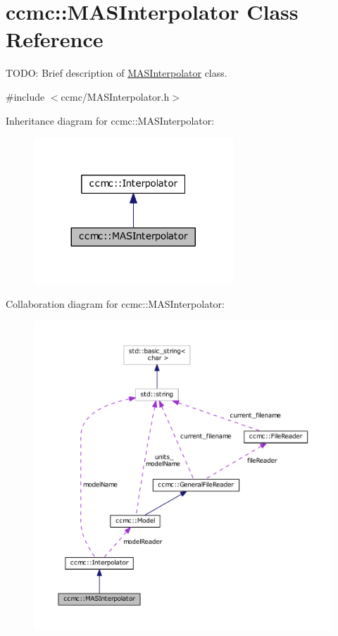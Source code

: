 \hypertarget{classccmc_1_1_m_a_s_interpolator}{\section{ccmc\-:\-:M\-A\-S\-Interpolator Class Reference}
\label{classccmc_1_1_m_a_s_interpolator}
}


T\-O\-D\-O\-: Brief description of \hyperlink{classccmc_1_1_m_a_s_interpolator}{M\-A\-S\-Interpolator} class.  




{\ttfamily \#include $<$ccmc/\-M\-A\-S\-Interpolator.\-h$>$}



Inheritance diagram for ccmc\-:\-:M\-A\-S\-Interpolator\-:
\nopagebreak
\begin{figure}[H]
\begin{center}
\leavevmode
\includegraphics[width=212pt]{classccmc_1_1_m_a_s_interpolator__inherit__graph}
\end{center}
\end{figure}


Collaboration diagram for ccmc\-:\-:M\-A\-S\-Interpolator\-:
\nopagebreak
\begin{figure}[H]
\begin{center}
\leavevmode
\includegraphics[width=350pt]{classccmc_1_1_m_a_s_interpolator__coll__graph}
\end{center}
\end{figure}
